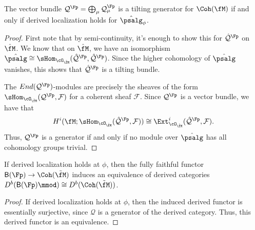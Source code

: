 \begin{lemma}\label{lem:tiling-localization}
The vector bundle $\mathcal{Q}^{\Fp}=\bigoplus_{\mu}\mathcal{Q}_\mu^{\Fp}$ is a tilting generator for $\Coh(\fM)$ if and only if derived localization holds for $\hat{\psalg}_\phi$.  
\end{lemma}
\begin{proof}
First note that  by semi-continuity, it's enough to show this for $\mathcal{\hat Q}^{\Fp}$ on $\hat{\fM}$.  We know that on $\hat{\fM}$, we have an isomorphism $\hat{\psalg}\cong \sHom_{\cO_{\hat{\fM}}}(\mathcal{\hat Q}^{\Fp},\mathcal{\hat Q}^{\Fp})$.  Since the higher cohomology of $\hat{\psalg}$ vanishes, this shows that $\mathcal{\hat Q}^{\Fp}$ is a tilting bundle.  

The $End(\mathcal{Q}^{\Fp})$-modules are precisely the sheaves of the form $\sHom_{\cO_{\hat{\fM}}}(\mathcal{Q}^{\Fp},\mathcal{F})$ for a coherent sheaf $\mathcal{F}$. Since $\mathcal{Q}^{\Fp}$ is a vector bundle, we have that \[H^i(\fM;\sHom_{\cO_{\hat{\fM}}}(\mathcal{\hat Q}^{\Fp},\mathcal{F}))\cong \Ext^i_{\cO_{\hat{\fM}}}(\mathcal{\hat Q}^{\Fp},\mathcal{F}).\] Thus, $\mathcal{Q}^{\Fp}$ is a generator if and only if no module over $\hat{\psalg}$ has all cohomology groups trivial.   
\end{proof}

\begin{corollary} 
If derived localization holds at $\phi$, then the fully faithful functor  $\mathsf{B}(\Fp)\to \Coh(\tilde{\fM})$  induces an equivalence of derived categories $D^b(\mathsf{B}(\Fp)\mmod)\cong D^b(\Coh(\tilde{\fM}))$.
\end{corollary}
\begin{proof}
  If derived localization holds at $\phi$, then the induced derived functor is essentially surjective, since $\mathcal{Q}$ is a generator of the derived category.  Thus, this derived functor is an equivalence. 
\end{proof}


